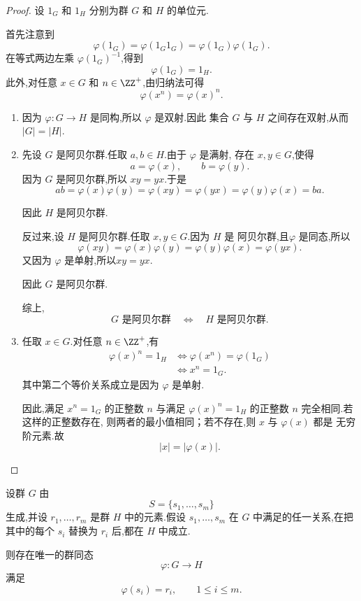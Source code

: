 \begin{proof}
	设 $1_G$ 和 $1_H$ 分别为群 $G$ 和 $H$ 的单位元.
	
	首先注意到
	\[
	\varphi(1_G)
	=\varphi(1_G1_G)
	=\varphi(1_G)\varphi(1_G).
	\]
	在等式两边左乘 $\varphi(1_G)^{-1}$,得到
	\[
	\varphi(1_G)=1_H.
	\]
	此外,对任意 $x\in G$ 和 $n\in\ZZ^+$,由归纳法可得
	\[
	\varphi(x^n)=\varphi(x)^n.
	\]
	
	\begin{enumerate}[label=(\alph*)]

		\item 因为 $\varphi:G\to H$ 是同构,所以 $\varphi$ 是双射.因此
		集合 $G$ 与 $H$ 之间存在双射,从而$|G|=|H|.$\item 先设 $G$ 是阿贝尔群.任取 $a,b\in H$.由于 $\varphi$ 是满射,
		存在 $x,y\in G$,使得
		\[
		a=\varphi(x),\qquad b=\varphi(y).
		\]
		因为 $G$ 是阿贝尔群,所以 $xy=yx$.于是\[ 	ab
			=\varphi(x)\varphi(y)=\varphi(xy)=\varphi(yx)=\varphi(y)\varphi(x)=ba. \]

		因此 $H$ 是阿贝尔群.
		
		反过来,设 $H$ 是阿贝尔群.任取 $x,y\in G$.因为 $H$ 是
		阿贝尔群,且$\varphi$ 是同态,所以
		\[
		\varphi(xy)=\varphi(x)\varphi(y)=\varphi(y)\varphi(x)=\varphi(yx).
		\]
		又因为 $\varphi$ 是单射,所以$xy=yx.$

		因此 $G$ 是阿贝尔群.
		
		综上,
		\[
		G\text{ 是阿贝尔群}
		\quad\Longleftrightarrow\quad
		H\text{ 是阿贝尔群}.
		\]
		
		\item 任取 $x\in G$.对任意 $n\in\ZZ^+$,有
		\begin{align*}
			\varphi(x)^n=1_H
			&\Longleftrightarrow
			\varphi(x^n)=\varphi(1_G)\\
			&\Longleftrightarrow
			x^n=1_G.
		\end{align*}
		其中第二个等价关系成立是因为 $\varphi$ 是单射.
		
		因此,满足 $x^n=1_G$ 的正整数 $n$ 与满足
		$\varphi(x)^n=1_H$ 的正整数 $n$ 完全相同.若这样的正整数存在,
		则两者的最小值相同；若不存在,则 $x$ 与 $\varphi(x)$ 都是
		无穷阶元素.故
		\[
		|x|=|\varphi(x)|.
		\]
	\end{enumerate}
\end{proof}
\begin{proposition}[由生成元与关系确定的同态]
	设群 $G$ 由
	\[
	S=\{s_1,\ldots,s_m\}
	\]
	生成,并设 $r_1,\ldots,r_m$ 是群 $H$ 中的元素.假设
	$s_1,\ldots,s_m$ 在 $G$ 中满足的任一关系,在把其中的每个
	$s_i$ 替换为 $r_i$ 后,都在 $H$ 中成立.
	
	则存在唯一的群同态
	\[
	\varphi:G\to H
	\]
	满足
	\[
	\varphi(s_i)=r_i,
	\qquad 1\leq i\leq m.
	\]

\end{proposition}

